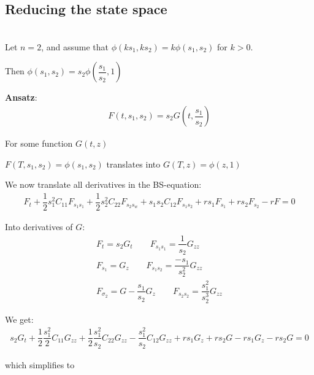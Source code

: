 \subsection{Reducing the state space}\hfill\\
\noindent Let $n=2$, and assume that $\phi(ks_1,ks_2) = k\phi(s_1,s_2)$ for $k>0$.\par
\noindent Then $\phi(s_1,s_2) = s_2\phi\left(\dfrac{s_1}{s_2},1\right)$
\par\bigskip
\noindent\textbf{Ansatz}:
\begin{equation*}
  \begin{gathered}
    F(t,s_1,s_2) = s_2G\left(t,\dfrac{s_1}{s_2}\right)
  \end{gathered}
\end{equation*}\par
\noindent For some function $G(t,z)$
\par\bigskip
\noindent $F(T,s_1,s_2) = \phi(s_1,s_2)$ translates into $G(T,z) = \phi(z,1)$\par
\noindent We now translate all derivatives in the BS-equation:
\begin{equation*}
  \begin{gathered}
    F_t+\dfrac{1}{2}s_1^2C_{11}F_{s_1s_1}+\dfrac{1}{2}s_2^2C_{22}F_{s_2s_w}+s_1s_2C_{12}F_{s_1s_2}+rs_1F_{s_1}+rs_2F_{s_2}-rF=0
  \end{gathered}
\end{equation*}\par
\noindent Into derivatives of $G:$
\begin{equation*}
  \begin{gathered}
    F_t = s_2G_t\qquad F_{s_1s_1} = \dfrac{1}{s_2}G_{zz}\\
    F_{s_1} = G_z\qquad F_{s_1s_2} = \dfrac{-s_1}{s_2^2}G_{zz}\\
    F_{\sigma_2} = G-\dfrac{s_1}{s_2}G_z\qquad F_{s_2s_2} =\dfrac{s_1^2}{s_2^3}G_{zz}
  \end{gathered}
\end{equation*}\par
\noindent We get:
\begin{equation*}
  \begin{gathered}
    s_2G_t+\dfrac{1}{2}\dfrac{s_1^2}{2}C_{11}G_{zz}+\dfrac{1}{2}\dfrac{s_1^2}{s_2}C_{22}G_{zz}-\dfrac{s_1^2}{s_2}C_{12}G_{zz}+rs_1G_z+rs_2G-rs_1G_z-rs_2G=0
  \end{gathered}
\end{equation*}\par
\noindent which simplifies to
